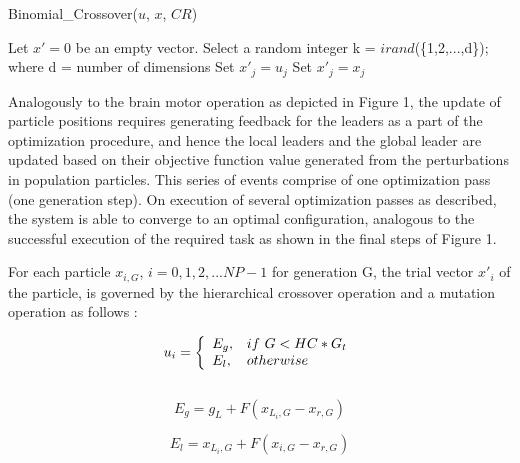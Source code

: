 \documentclass[a4paper,twoside]{article}
\begin{document}
\begin{algorithm}[b]
\caption{Binomial\_Crossover($u$, $x$, $CR$)}
\label{algo}
\begin{algorithmic}[1]
    \State Let $x' = 0$ be an empty vector.
    \State Select a random integer k = $irand$(\{1,2,...,d\}); where d = number of dimensions
        \State Set $x'_{j} = u_{j}$
      \Else
        \State Set $x'_{j} = x_{j}$
      \EndIf
    \EndFor
  \EndProcedure
\end{algorithmic}
\end{algorithm}


Analogously to the brain motor operation as depicted in Figure 1, the update of particle positions requires generating feedback for the leaders as a part of the optimization procedure, and hence the local leaders and the global leader are updated based on their objective function value generated from the perturbations in population particles. This series of events comprise of one optimization pass (one generation step). On execution of several optimization passes as described, the system is able to converge to an optimal configuration, analogous to the successful execution of the required task as shown in the final steps of Figure 1.

For each particle $x_{i,G}$, $i = 0, 1, 2,...NP-1$ for generation G, the trial vector $x'_{i}$ of the particle, is governed by the hierarchical crossover operation and a mutation operation as follows : 

\vspace{-1.5mm}
\begin{equation}
u_i =  
\left\{
\begin{array}{ll}
      E_g, & if \thinspace\thinspace G < HC * G_{t} \\
      E_l, & otherwise \\
\end{array} 
\right. 
\end{equation}\\

\vspace{-5.5mm}
\begin{equation}
\label{one}
E_g = g_L + F (x_{L_i,G} - x_{r,G})
\end{equation}

\vspace{-1.5mm}
\begin{equation}
\label{two}
E_l = x_{L_i,G} + F (x_{i,G} - x_{r,G})
\end{equation}
\end{document}
